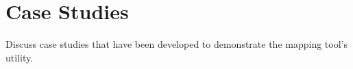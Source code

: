\section{Case Studies}

Discuss case studies that have been developed to demonstrate the mapping tool's utility.